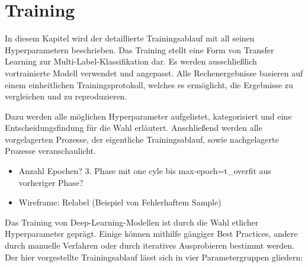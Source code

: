 \chapter{Training}
\label{ch:training}

In diesem Kapitel wird der detaillierte Trainingsablauf mit all seinen Hyperparametern beschrieben.
Das Training stellt eine Form von Transfer Learning zur Multi-Label-Klassifikation dar.
Es werden ausschließlich vortrainierte Modell verwendet und angepasst.
Alle Rechenergebnisse basieren auf einem einheitlichen Trainingsprotokoll, welches es ermöglicht, die Ergebnisse zu vergleichen und zu reproduzieren.

Dazu werden alle möglichen Hyperparameter aufgelistet, kategorisiert und eine Entscheidungsfindung für die Wahl erläutert.
Anschließend werden alle vorgelagerten Prozesse, der eigentliche Trainingsablauf, sowie nachgelagerte Prozesse veranschaulicht.

\begin{tcolorbox}[title=Todo]
    \begin{itemize}
        \item Anzahl Epochen? 3. Phase mit one cyle bis max-epoch=t\_overfit aus vorheriger Phase?
        \item Wireframe: Relabel (Beispiel von Fehlerhaftem Sample)
    \end{itemize}
\end{tcolorbox}

Das Training von Deep-Learning-Modellen ist durch die Wahl etlicher Hyperparameter geprägt.
Einige können mithilfe gängiger Best Practices, andere durch manuelle Verfahren oder durch iteratives Ausprobieren bestimmt werden.
Der hier vorgestellte Trainingsablauf lässt sich in vier Parametergruppen gliedern:

